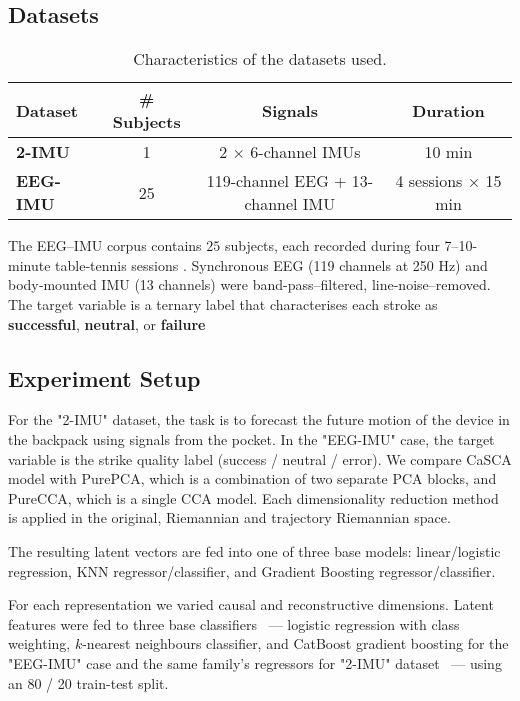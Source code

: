\documentclass[14pt]{extarticle}
\begin{document}
	\subsection{Datasets}
	
	\begin{table}[h!]
		\centering
		\renewcommand{\arraystretch}{1.15}
		\begin{tabular}{@{}lccc@{}}
			\toprule
			\textbf{Dataset} & \textbf{\# Subjects} & \textbf{Signals} & \textbf{Duration} \\
			\midrule
			\textbf{2-IMU} & 1 & 2 × 6-channel IMUs & 10 min \\
			\textbf{EEG-IMU} & 25 & 119-channel EEG + 13-channel IMU & 4 sessions × 15 min \\
			\bottomrule
		\end{tabular}
		\caption{Characteristics of the datasets used.}
	\end{table}
	
	The EEG–IMU corpus contains $25$ subjects, each recorded during four
	7–10-minute table-tennis sessions \citep{tennisdataset}.
	Synchronous EEG (119 channels at 250 Hz) and body‐mounted IMU (13
	channels) were band-pass–filtered, line-noise–removed.
	The target variable is a ternary label that characterises each stroke
	as \textbf{successful}, \textbf{neutral}, or \textbf{failure}
	  
	
	\subsection{Experiment Setup}
	
	For the "2-IMU" dataset, the task is to forecast the future motion of the device in the backpack using signals from the pocket.  
	In the "EEG-IMU" case, the target variable is the strike quality label (success / neutral / error).  
	We compare CaSCA model with PurePCA, which is a combination of two separate PCA blocks, and PureCCA, which is a single CCA model.
	Each dimensionality reduction method is applied in the original, Riemannian and trajectory Riemannian space.
	
	The resulting latent vectors are fed into one of three base models: linear/logistic regression, KNN regressor/classifier, and Gradient Boosting regressor/classifier.
	
	For each representation we varied causal and reconstructive dimensions.  
	Latent features were fed to three base classifiers ~--- logistic regression with class weighting, $k$-nearest neighbours classifier, and CatBoost gradient boosting for the "EEG-IMU" case and the same family's regressors for "2-IMU" dataset ~--- using an 80 / 20 train-test split.
	
\end{document}
